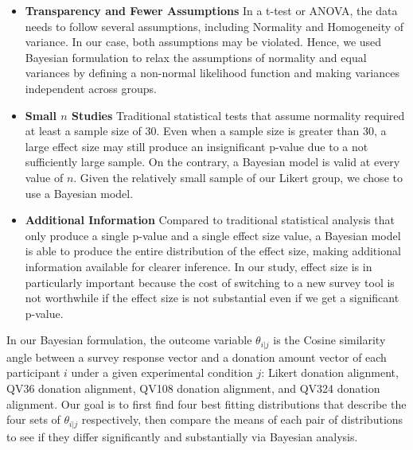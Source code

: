 \begin{itemize}
    \item \textbf{Transparency and Fewer Assumptions} 
    In a t-test or ANOVA, 
    the data needs to follow several assumptions, 
    including Normality and Homogeneity of variance. 
    In our case, both assumptions may be violated. 
    Hence, we used Bayesian formulation 
    to relax the assumptions of normality and 
    equal variances by defining 
    a non-normal likelihood function 
    and making variances independent across groups.
    \item \textbf{Small $n$ Studies} 
    Traditional statistical tests 
    that assume normality 
    required at least a sample size of 30. 
    Even when a sample size is greater than 30, 
    a large effect size may still produce 
    an insignificant p-value 
    due to a not sufficiently large sample. 
    On the contrary, 
    a Bayesian model is valid at every value of $n$. 
    Given the relatively small sample 
    of our Likert group, 
    we chose to use a Bayesian model.
    \item \textbf{Additional Information} 
    Compared to traditional statistical analysis 
    that only produce a single p-value 
    and a single effect size value, 
    a Bayesian model is able to produce 
    the entire distribution of the effect size, 
    making additional information available 
    for clearer inference. 
    In our study, 
    effect size is in particularly important 
    because the cost of switching to a new survey tool 
    is not worthwhile 
    if the effect size is not substantial 
    even if we get a significant p-value.
\end{itemize}

In our Bayesian formulation, 
the outcome variable $\theta_{i|j}$ 
is the Cosine similarity angle 
between a survey response vector and 
a donation amount vector of each participant $i$ 
under a given experimental condition $j$: 
Likert donation alignment, QV36 donation alignment, 
QV108 donation alignment, and QV324 donation alignment. 
Our goal is to first find four best fitting distributions 
that describe the four sets of $\theta_{i|j}$ respectively, 
then compare the means of each pair of distributions 
to see if they differ significantly 
and substantially via Bayesian analysis. 

